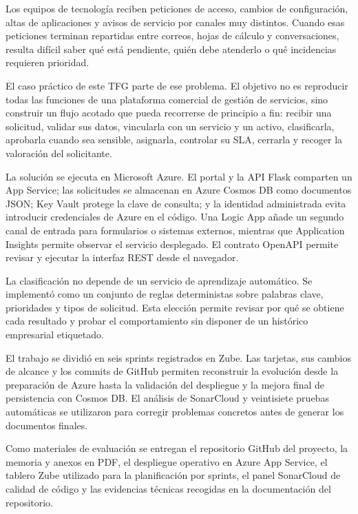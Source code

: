 
Los equipos de tecnología reciben peticiones de acceso, cambios de configuración, altas de aplicaciones y avisos de servicio por canales muy distintos. Cuando esas peticiones terminan repartidas entre correos, hojas de cálculo y conversaciones, resulta difícil saber qué está pendiente, quién debe atenderlo o qué incidencias requieren prioridad.

El caso práctico de este TFG parte de ese problema. El objetivo no es reproducir todas las funciones de una plataforma comercial de gestión de servicios, sino construir un flujo acotado que pueda recorrerse de principio a fin: recibir una solicitud, validar sus datos, vincularla con un servicio y un activo, clasificarla, aprobarla cuando sea sensible, asignarla, controlar su SLA, cerrarla y recoger la valoración del solicitante.

La solución se ejecuta en Microsoft Azure. El portal y la API Flask comparten un App Service; las solicitudes se almacenan en Azure Cosmos DB como documentos JSON; Key Vault protege la clave de consulta; y la identidad administrada evita introducir credenciales de Azure en el código. Una Logic App añade un segundo canal de entrada para formularios o sistemas externos, mientras que Application Insights permite observar el servicio desplegado. El contrato OpenAPI permite revisar y ejecutar la interfaz REST desde el navegador.

La clasificación no depende de un servicio de aprendizaje automático. Se implementó como un conjunto de reglas deterministas sobre palabras clave, prioridades y tipos de solicitud. Esta elección permite revisar por qué se obtiene cada resultado y probar el comportamiento sin disponer de un histórico empresarial etiquetado.

El trabajo se dividió en seis sprints registrados en Zube. Las tarjetas, sus cambios de alcance y los commits de GitHub permiten reconstruir la evolución desde la preparación de Azure hasta la validación del despliegue y la mejora final de persistencia con Cosmos DB. El análisis de SonarCloud y veintisiete pruebas automáticas se utilizaron para corregir problemas concretos antes de generar los documentos finales.

Como materiales de evaluación se entregan el repositorio GitHub del proyecto, la memoria y anexos en PDF, el despliegue operativo en Azure App Service, el tablero Zube utilizado para la planificación por sprints, el panel SonarCloud de calidad de código y las evidencias técnicas recogidas en la documentación del repositorio.
